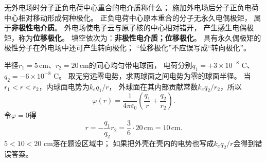 \problemtext 无外电场时分子正负电荷中心重合的电介质称什么；
施加外电场后分子正负电荷中心相对移动形成何种极化。
\workings
正负电荷中心原本重合的分子无永久电偶极矩，
属于\textbf{非极性电介质}。
外电场使电子云与原子核的中心相对错开，
产生感生电偶极矩，称为\textbf{位移极化}。
填空依次为：\textbf{非极性电介质；位移极化}。
\crosscheck 具有永久偶极矩的极性分子在外电场中还可产生转向极化；
“位移极化”不应误写成“转向极化”。

\problemtext 半径$r_1=5\,\mathrm{cm}$、$r_2=20\,\mathrm{cm}$的同心均匀带电球面，
电荷分别$q_1=+3\times10^{-8}$ C、$q_2=-6\times10^{-8}$ C。
取无穷远零电势，求两球面之间电势为零的球面半径。
\workings
当$r_1<r<r_2$，内球面电势为$k_eq_1/r$，
外球面在其内部贡献常数$k_eq_2/r_2$，所以
\[
\varphi(r)=\frac{1}{4\pi\varepsilon_0}
\left(\frac{q_1}{r}+\frac{q_2}{r_2}\right).
\]
令$\varphi=0$得
\[
\boxed{r=-\frac{q_1}{q_2}r_2
=\frac{3}{6}\cdot20\,\mathrm{cm}
=10\,\mathrm{cm}}.
\]
\crosscheck $5<10<20$ cm落在题设区域中；
如果把外壳在壳内的电势也写成$k_eq_2/r$会得到错误答案。
